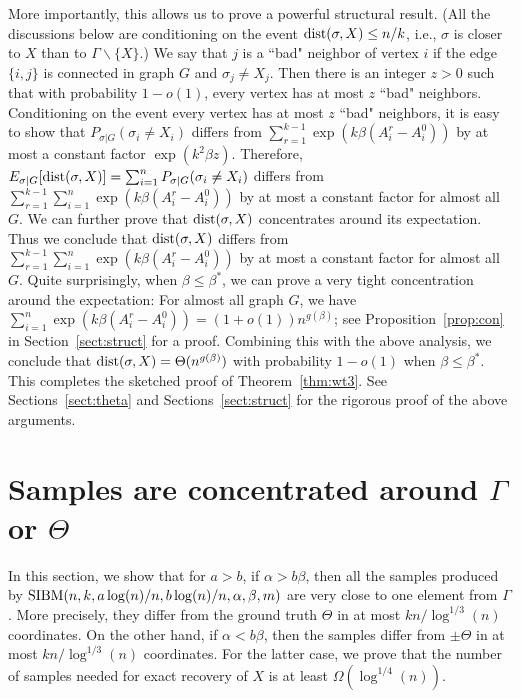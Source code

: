 \documentclass{article}
\begin{document}
More importantly, this allows us to prove a powerful structural result. (All the discussions below are conditioning on the event $\operatorname{dist}(\sigma,X)\le n/k$, i.e., $\sigma$ is closer to $X$ than to $\Gamma\backslash\{X\}$.) We say that $j$ is a ``bad" neighbor of vertex $i$ if the edge $\{i,j\}$ is connected in graph $G$ and $\sigma_j\neq X_j$. Then there is an integer $z>0$ such that with probability $1-o(1)$, every vertex has at most $z$ ``bad" neighbors.
Conditioning on the event every vertex has at most $z$ ``bad" neighbors, it is easy to show that $P_{\sigma|G}(\sigma_i \neq X_i)$ differs from $\sum_{r=1}^{k-1}\exp (k \beta (A^r_i-A^0_i))$ by at most a constant factor $\exp(k^2\beta z)$.
Therefore, $E_{\sigma|G}[\operatorname{dist}(\sigma,X)]=\sum_{i=1}^n P_{\sigma|G}(\sigma_i \neq X_i)$ differs from $\sum_{r=1}^{k-1} \sum_{i=1}^n\exp (k \beta (A^r_i-A^0_i))$ by at most a constant factor for almost all $G$.
We can further prove that $\operatorname{dist}(\sigma,X)$ concentrates around its expectation. Thus we conclude that $\operatorname{dist}(\sigma,X)$ differs from $\sum_{r=1}^{k-1} \sum_{i=1}^n\exp (k \beta (A^r_i-A^0_i))$ by at most a constant factor for almost all $G$.
Quite surprisingly, when $\beta\le\beta^\ast$, we can prove a very tight concentration around the expectation: For almost all graph $G$, we have $\sum_{i=1}^n\exp (k \beta (A^r_i-A^0_i))=(1+o(1))n^{g(\beta)}$; see Proposition~\ref{prop:con} in Section~\ref{sect:struct} for a proof. Combining this with the above analysis, we conclude that $\operatorname{dist}(\sigma,X)=\Theta(n^{g(\beta)})$ with probability $1-o(1)$ when $\beta\le\beta^\ast$. This completes the sketched proof of Theorem~\ref{thm:wt3}.
See Sections~\ref{sect:theta} and Sections~\ref{sect:struct} for the rigorous proof of the above arguments.

\section{Samples are concentrated around $\Gamma$ or $\Theta$} \label{sect:aln}
In this section, we show that for $a>b$, if $\alpha>b\beta$, then all the samples produced by $\SIBM(n, k,\linebreak[4]
a\log(n)/n, b\log(n)/n,\alpha,\beta,m)$ are very close to one element from $\Gamma$. More precisely, they differ from the ground truth $\Theta$ in at most $kn/\log^{1/3}(n)$ coordinates.
On the other hand, if $\alpha<b\beta$, then the samples differ from  $\pm \Theta$ in at most $kn/\log^{1/3}(n)$ coordinates.
For the latter case, we prove that the number of samples needed for exact recovery of $X$ is at least $\Omega(\log^{1/4}(n))$.
\end{document}
